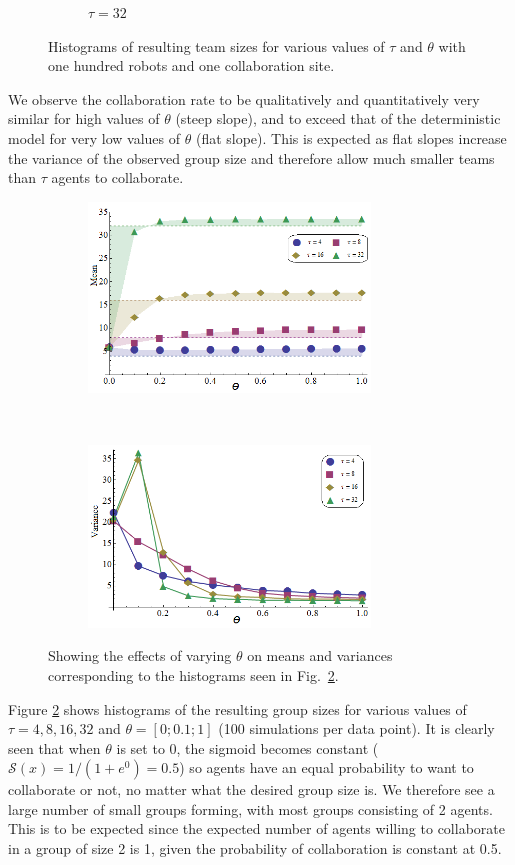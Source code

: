 \documentclass{TeXstyles/DARS/svmult}  %
\newcommand{\sig}{\mathcal{S}}
\begin{document}
\begin{figure}[!htb]
\begin{subfigure}{0.5\textwidth}
\centering\caption{$\tau = 32$}\label{fig:collabsweep32}
\end{subfigure}
\caption{Histograms of resulting team sizes for various values of $\tau$ and $\theta$ with one hundred robots and one collaboration site.}\label{fig:collabsweep}
\end{figure}

We observe the collaboration rate to be qualitatively and quantitatively very similar for high values of $\theta$ (steep slope), and to exceed that of the deterministic model for very low values of $\theta$ (flat slope). This is expected as flat slopes increase the variance of the observed group size and therefore allow much smaller teams than $\tau$ agents to collaborate.

\begin{figure}[!htb]
\begin{subfigure}{0.5\textwidth}
\centering\includegraphics[width=7.5cm]{figures/means.png}
\centering\caption{}\label{fig:means}
\end{subfigure}~
\begin{subfigure}{0.5\textwidth}
\centering\includegraphics[width=7.5cm]{figures/variances.png}
\centering\caption{}\label{fig:vars}
\end{subfigure}
\caption{Showing the effects of varying $\theta$ on means and variances corresponding to the histograms seen in Fig.~\ref{fig:collabsweep}.}\label{fig:meansvars}
\end{figure}

Figure \ref{fig:collabsweep} shows histograms of the resulting group sizes for various values of $\tau=4, 8, 16, 32$ and $\theta=[0;0.1;1]$ (100 simulations per data point). It is clearly seen that when $\theta$ is set to 0, the sigmoid becomes constant ($\sig(x) = 1/(1 + e^{0}) = 0.5$) so agents have an equal probability to want to collaborate or not, no matter what the desired group size is. We therefore see a large number of small groups forming, with most groups consisting of 2 agents. This is to be expected since the expected number of agents willing to collaborate in a group of size 2 is 1, given the probability of collaboration is constant at 0.5.
\end{document}

